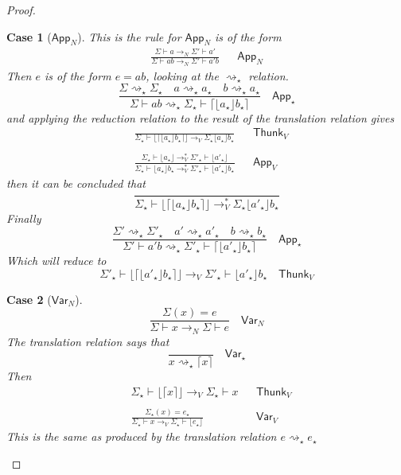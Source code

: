 \documentclass[float=false, crop=false]{standalone}
\newtheorem{case}{Case}
\numberwithin{subcase}{case}
\newcommand{\tlang}{\star}
\newcommand{\thunk}[1]{\lceil #1 \rceil}
\newcommand{\unwrap}[1]{\lfloor #1 \rfloor}
\newcommand{\tcbn}{\rightarrow_N}
\newcommand{\tcbv}{\rightarrow_V}
\newcommand{\tccbv}{\rightarrow_V^*}
\newcommand{\tlthunk}{\rightsquigarrow_\tlang}
\begin{document}
\begin{proof}
  \begin{case}[$\mathsf{App}_N$]
    This is the rule for $\textsf{App}_N$ is of the form
    \begin{align*}
      \frac{\Sigma \vdash a \tcbn \Sigma' \vdash a'}
      {\Sigma \vdash ab \tcbn \Sigma' \vdash a' b} && \mathsf{App}_N
    \end{align*}
    Then $e$ is of the form $e = a b$, looking at the $\tlthunk$ relation.
    \[\frac{\Sigma \tlthunk \Sigma_\tlang \quad a 
        \tlthunk a_\tlang \quad b \tlthunk a_\tlang}
      { \Sigma \vdash a b\tlthunk \Sigma_\tlang \vdash 
        \thunk{\unwrap{a_\tlang }b_\tlang}} \quad \mathsf{App}_\tlang\]
    and applying the reduction relation to the result of the translation 
    relation gives
    \begin{align*}
      &\frac{}{\Sigma_\tlang \vdash \unwrap{\thunk{\unwrap{a_\tlang} b_\tlang} }  
        \tcbv \Sigma_\tlang  \unwrap{a_\tlang} b_\tlang} && \mathsf{Thunk}_V\\ \\
      &\frac{\Sigma_\tlang \vdash \unwrap{a_\tlang} \tccbv \Sigma'_\tlang \vdash \unwrap{a'_\tlang}}{
      \Sigma_\tlang \vdash \unwrap{a_\tlang} b_\tlang \tccbv \Sigma'_\tlang \vdash 
      \unwrap{a'_\tlang} b_\tlang } &&
      \mathsf{App}_V
    \end{align*}
    then it can be concluded that 
    \[ \frac{}{\Sigma_\tlang \vdash \unwrap{\thunk{\unwrap{a_\tlang} b_\tlang}}
        \tccbv \Sigma_\tlang \unwrap{a'_\tlang} b_\tlang  } \]
    Finally \[ \frac{\Sigma' \tlthunk \Sigma'_\tlang \quad a' \tlthunk a'_\tlang \quad b \tlthunk b_\tlang}
      {\Sigma' \vdash a' b \tlthunk \Sigma'_\tlang \vdash \thunk{\unwrap{a'_\tlang} b_\tlang} } \quad \mathsf{App}_\tlang \]
    Which will reduce to
    \[\Sigma'_\tlang \vdash \unwrap{\thunk{\unwrap{a'_\tlang}b_\tlang}} \tcbv \Sigma'_\tlang \vdash
    \unwrap {a'_\tlang} b_\tlang \quad \mathsf{Thunk}_V\]

  \end{case}

  \begin{case}[$\mathsf{Var}_N$]
    \[ \frac{\Sigma(x) = e}{\Sigma \vdash x \tcbn \Sigma \vdash e} \quad
      \mathsf{Var}_N \]
    The translation relation says that \[ \frac{}{x \tlthunk \thunk{x}} 
      \quad \mathsf{Var}_\tlang \]
    Then 
    \begin{align*}
    & \Sigma_\tlang \vdash \unwrap{\thunk{x}} \tcbv \Sigma_\tlang \vdash x  && \mathsf{Thunk}_V \\ \\
    & \frac{\Sigma_\tlang(x) = e_\tlang}
    {\Sigma_\tlang \vdash x  \tcbv \Sigma_\tlang \vdash \unwrap{e_\tlang}} && \mathsf{Var}_V 
  \end{align*}
    This is the same as produced by the translation relation 
    \mbox{$e \tlthunk e_\tlang$}
  \end{case}


\end{proof}
\end{document}

